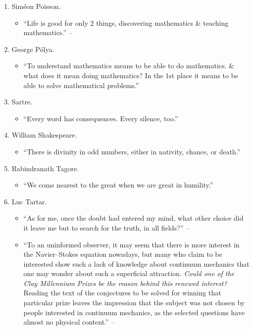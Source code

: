 \documentclass{article}
\begin{document}
\begin{enumerate}
\begin{itemize}
	\end{itemize}
	\item {\sc Sim\'eon Poisson.}
	\begin{itemize}
		\item ``Life is good for only 2 things, discovering mathematics \& teaching mathematics.'' -- \cite[p. v]{Gelca_Andreescu2017}
	\end{itemize}
	\item {\sc George P\'olya.}
	\begin{itemize}
		\item ``To understand mathematics means to be able to do mathematics. \& what does it mean doing mathematics? In the 1st place it means to be able to solve mathematical problems.''
	\end{itemize}
	\item {\sc Sartre.}
	\begin{itemize}
		\item ``Every word has consequences. Every silence, too.''
	\end{itemize}	
	\item {\sc William Shakespeare.}
	\begin{itemize}
		\item ``There is divinity in odd numbers, either in nativity, chance, or death.''
	\end{itemize}
	\item {\sc Rabindranath Tagore.}
	\begin{itemize}
		\item ``We come nearest to the great when we are great in humility.''
	\end{itemize}
	\item {\sc Luc Tartar.}
	\begin{itemize}
		\item ``As for me, once the doubt had entered my mind, what other choice did it leave me but to search for the truth, in all fields?'' -- \cite{Tartar2006}
		\item ``To an uninformed observer, it may seem that there is more interest in the Navier--Stokes equation nowadays, but many who claim to be interested show such a lack of knowledge about continuum mechanics that one may wonder about such a superficial attraction. {\it Could one of the Clay Millennium Prizes be the reason behind this renewed interest?} Reading the text of the conjectures to be solved for winning that particular prize leaves the impression that the subject was not chosen by people interested in continuum mechanics, as the selected questions have almost no physical content.'' -- \cite[Preface, p. vii]{Tartar2006}		

\end{itemize}
\end{enumerate}
\end{document}
